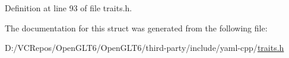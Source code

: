 Definition at line 93 of file traits.\+h.



The documentation for this struct was generated from the following file\+:\begin{DoxyCompactItemize}
\item 
D\+:/\+V\+C\+Repos/\+Open\+G\+L\+T6/\+Open\+G\+L\+T6/third-\/party/include/yaml-\/cpp/\mbox{\hyperlink{traits_8h}{traits.\+h}}\end{DoxyCompactItemize}
